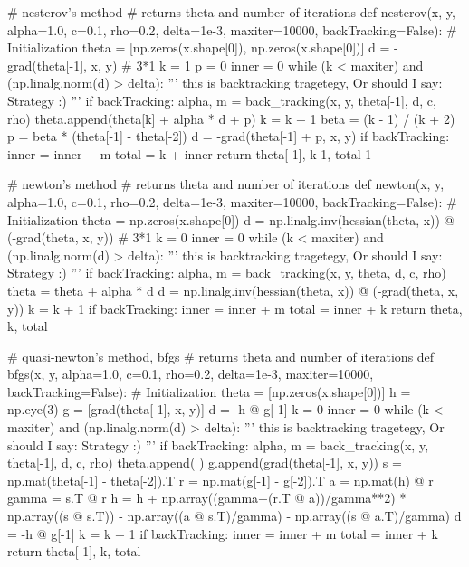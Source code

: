 \documentclass[12pt, a4 paper]{article}
\begin{document}
\begin{python}
# nesterov's method
# returns theta and number of iterations
def nesterov(x, y, alpha=1.0, c=0.1, rho=0.2, delta=1e-3, maxiter=10000, backTracking=False):
    # Initialization
    theta = [np.zeros(x.shape[0]), np.zeros(x.shape[0])]
    d = -grad(theta[-1], x, y) # 3*1
    k = 1
    p = 0
    inner = 0
    while (k < maxiter) and (np.linalg.norm(d) > delta):
        '''
        this is backtracking tragetegy, Or should I say: Strategy :)
        '''
        if backTracking:
            alpha, m = back_tracking(x, y, theta[-1], d, c, rho)
        theta.append(theta[k] + alpha * d + p)
        k = k + 1
        beta = (k - 1) / (k + 2)
        p = beta * (theta[-1] - theta[-2])
        d = -grad(theta[-1] + p, x, y)
        if backTracking:
            inner = inner + m
    total = k + inner
    return theta[-1], k-1, total-1



# newton's method
# returns theta and number of iterations
def newton(x, y, alpha=1.0, c=0.1, rho=0.2, delta=1e-3, maxiter=10000, backTracking=False):
    # Initialization
    theta = np.zeros(x.shape[0])
    d = np.linalg.inv(hessian(theta, x)) @ (-grad(theta, x, y)) # 3*1
    k = 0
    inner = 0
    while (k < maxiter) and (np.linalg.norm(d) > delta):
        '''
        this is backtracking tragetegy, Or should I say: Strategy :)
        '''
        if backTracking:
            alpha, m = back_tracking(x, y, theta, d, c, rho)
        theta = theta + alpha * d
        d = np.linalg.inv(hessian(theta, x)) @ (-grad(theta, x, y))
        k = k + 1
        if backTracking:
            inner = inner + m
    total = inner + k
    return theta, k, total



# quasi-newton's method, bfgs
# returns theta and number of iterations
def bfgs(x, y, alpha=1.0, c=0.1, rho=0.2, delta=1e-3, maxiter=10000, backTracking=False):
    # Initialization    
    theta = [np.zeros(x.shape[0])]
    h = np.eye(3)
    g = [grad(theta[-1], x, y)]
    d = -h @ g[-1]  
    k = 0
    inner = 0
    while (k < maxiter) and (np.linalg.norm(d) > delta):
        '''
        this is backtracking tragetegy, Or should I say: Strategy :)
        '''
        if backTracking:
            alpha, m = back_tracking(x, y, theta[-1], d, c, rho)
        theta.append( )
        g.append(grad(theta[-1], x, y))
        s = np.mat(theta[-1] - theta[-2]).T
        r = np.mat(g[-1] - g[-2]).T
        a = np.mat(h) @ r
        gamma = s.T @ r
        h = h + np.array((gamma+(r.T @ a))/gamma**2) * np.array((s @ s.T)) - np.array((a @ s.T)/gamma) - np.array((s @ a.T)/gamma)
        d = -h @ g[-1]
        k = k + 1
        if backTracking:
            inner = inner + m
        total = inner + k
    return theta[-1], k, total  



\end{python}
\end{document}

